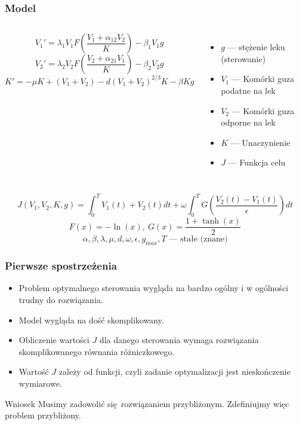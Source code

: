 \documentclass{beamer}
\newcommand{\colw}[1]{\column{#1\textwidth}}
\begin{document}
\begin{frame}
  \frametitle{Model}
  \begin{columns}
    \colw{.6}
    \[V_1' = \lambda_1V_1F\left(\frac{V_1 + \alpha_{12}V_2}{K}\right) - \beta_1V_1g\]
    \[V_2' = \lambda_2V_2F\left(\frac{V_2 + \alpha_{21}V_1}{K}\right) - \beta_2V_2g\]
\[K' = -\mu K + (V_1+V_2) - d{(V_1 + V_2)}^{2/3}K - \beta K g\]
    \colw{.4}
    \begin{itemize}
    \item $g$ --- stężenie leku (sterowanie)
    \item $V_1$ --- Komórki guza podatne na lek
    \item $V_2$ --- Komórki guza odporne na lek
    \item $K$ --- Unaczynienie
    \item $J$ --- Funkcja celu
    \end{itemize}
  \end{columns}
\[J(V_1, V_2, K, g) = \int_0^T V_1(t) + V_2(t)dt + \omega\int_0^T G\left(\frac{V_2(t) - V_1(t)}{\epsilon}\right) dt \]
  \[F(x) = -\ln(x),\: G(x) = \frac{1+\tanh(x)}{2}\]
  \[\alpha, \beta, \lambda, \mu, d, \omega, \epsilon, g_{max}, T \text{ --- stałe (znane)} \]
\end{frame}

\begin{frame}
  \frametitle{Pierwsze spostrzeżenia}
  \begin{itemize}
  \item Problem optymalnego sterowania wygląda na bardzo ogólny i w ogólności trudny do rozwiązania.
  \item Model wygląda na dość skomplikowany.
  \item Obliczenie wartości $J$ dla danego sterowania wymaga rozwiązania skomplikowanego równania różniczkowego.
  \item Wartość $J$ zależy od funkcji, czyli zadanie optymalizacji jest nieskończenie wymiarowe.
  \end{itemize}
  \begin{block}{Wniosek}
    Musimy zadowolić się rozwiązaniem przybliżonym. Zdefiniujmy więc problem przybliżony.
  \end{block}
\end{frame}
\end{document}
